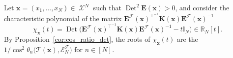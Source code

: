 \documentclass[twoside,11pt]{book}
\numberwithin{theorem}{chapter}
\numberwithin{definition}{chapter}
\numberwithin{proposition}{chapter}
\numberwithin{corollary}{chapter}
\numberwithin{example}{chapter}
\numberwithin{lemma}{chapter}
\numberwithin{assumption}{chapter}
\numberwithin{equation}{chapter}
\numberwithin{figure}{chapter}
\DeclareMathOperator{\Tr}{Tr}
\DeclareMathOperator{\Det}{Det}
\DeclareMathOperator{\Tran}{\intercal}
\DeclareMathOperator{\X}{\mathcal{X}}
\begin{document}
Let $\bm{x} = (x_{1}, \dots, x_{N}) \in \X^{N}$ such that $\Det^{2} \bm{E}(\bm{x}) > 0$, and consider the characteristic polynomial of the matrix $\bm{E}^{\mathcal{F}}(\bm{x})^{\Tran^{-1}}\bm{K}(\bm{x})\bm{E}^{\mathcal{F}}(\bm{x})^{-1}$
\begin{equation}
\chi_{\bm{x}}(t) = \Det \Big( \bm{E}^{\mathcal{F}}(\bm{x})^{\Tran^{-1}}\bm{K}(\bm{x})\bm{E}^{\mathcal{F}}(\bm{x})^{-1}  - t \mathbb{I}_{N} \Big) \in \mathbb{R}_{N}[t].
\end{equation}
By Proposition~\ref{cor:cos_ratio_det}, the roots of $\chi_{\bm{x}}(t)$ are  the $1/\cos^{2} \theta_{n}\big(\mathcal{T}(\bm{x}), \mathcal{E}_{N}^{\mathcal{F}} \big)$ for $n \in [N]$.
\end{document}
